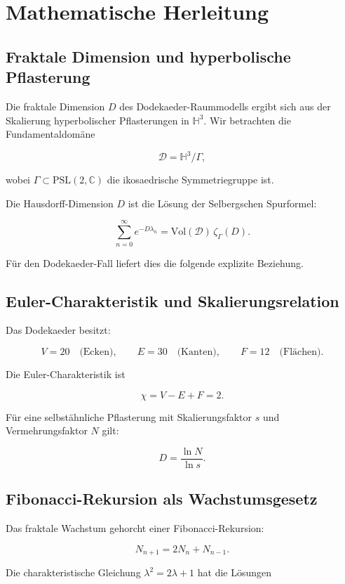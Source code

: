 \documentclass[11pt,a4paper]{article}
\begin{document}
\section{Mathematische Herleitung}

\subsection{Fraktale Dimension und hyperbolische Pflasterung}

Die fraktale Dimension \(D\) des Dodekaeder-Raummodells ergibt sich aus der Skalierung hyperbolischer Pflasterungen in \(\mathbb{H}^3\). Wir betrachten die Fundamentaldomäne

\[
\mathcal{D} = \mathbb{H}^3 / \Gamma,
\]

wobei \(\Gamma \subset \text{PSL}(2,\mathbb{C})\) die ikosaedrische Symmetriegruppe ist.

Die Hausdorff-Dimension \(D\) ist die Lösung der Selbergschen Spurformel:

\[
\sum_{n=0}^{\infty} e^{-D\lambda_n} = \text{Vol}(\mathcal{D}) \, \zeta_{\Gamma}(D).
\]

Für den Dodekaeder-Fall liefert dies die folgende explizite Beziehung.

\subsection{Euler-Charakteristik und Skalierungsrelation}

Das Dodekaeder besitzt:

\[
V = 20 \quad \text{(Ecken)}, \qquad E = 30 \quad \text{(Kanten)}, \qquad F = 12 \quad \text{(Flächen)}.
\]

Die Euler-Charakteristik ist

\[
\chi = V - E + F = 2.
\]

Für eine selbstähnliche Pflasterung mit Skalierungsfaktor \(s\) und Vermehrungsfaktor \(N\) gilt:

\[
D = \frac{\ln N}{\ln s}.
\]

\subsection{Fibonacci-Rekursion als Wachstumsgesetz}

Das fraktale Wachstum gehorcht einer Fibonacci-Rekursion:

\[
N_{n+1} = 2N_n + N_{n-1}.
\]

Die charakteristische Gleichung \(\lambda^2 = 2\lambda + 1\) hat die Lösungen
\end{document}

